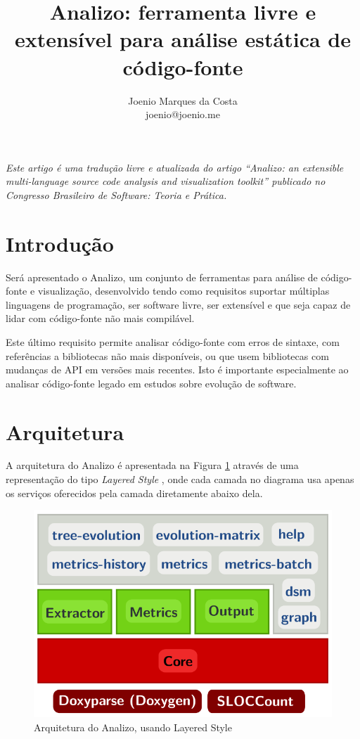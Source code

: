 \documentclass{article}
\title{
  Analizo: ferramenta livre e extensível para análise estática de código-fonte
}
\author{Joenio Marques da Costa\\
  {\small joenio@joenio.me}
}
\begin{document}
\maketitle

{\it Este artigo é uma tradução livre e atualizada do artigo ``Analizo: an
extensible multi-language source code analysis and visualization toolkit''
\cite{Terceiro2010Analizo} publicado no Congresso Brasileiro de Software:
Teoria e Prática.}

\section{Introdução}

Será apresentado o Analizo, um conjunto de ferramentas para
análise de código-fonte e visualização, desenvolvido tendo como requisitos
suportar múltiplas linguagens de programação, ser software livre, ser extensível e
que seja capaz de lidar com código-fonte não mais compilável.

Este último requisito permite analisar código-fonte com erros de sintaxe, com
referências a bibliotecas não mais disponíveis, ou que usem bibliotecas com
mudanças de API em versões mais recentes. Isto é importante especialmente ao
analisar código-fonte legado em estudos sobre evolução de software.

\section{Arquitetura}

A arquitetura do Analizo é apresentada na Figura \ref{arquitetura-analizo}
através de uma representação do tipo {\it Layered Style} \cite{Clements2002},
onde cada camada no diagrama usa apenas os serviços oferecidos pela camada
diretamente abaixo dela.

\begin{figure}[h]
\center
\includegraphics[scale=0.3]{analizo-architecture.png}
\caption{Arquitetura do Analizo, usando Layered Style \cite{Clements2002}}
\label{arquitetura-analizo}
\end{figure}
\end{document}

